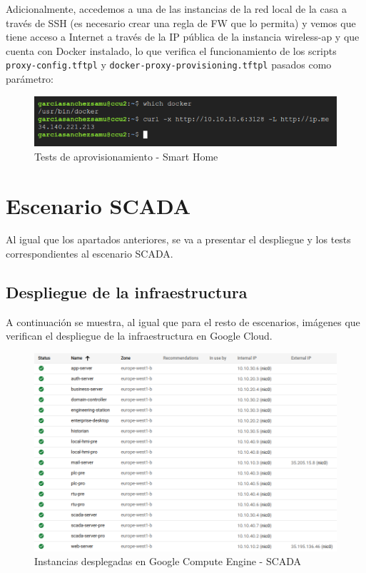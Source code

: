   Adicionalmente, accedemos a una de las instancias de la red local de la casa a través de SSH (es necesario crear una regla de FW que lo permita) y vemos que tiene acceso a Internet a través de la IP pública de la instancia wireless-ap y que cuenta con Docker instalado, lo que verifica el funcionamiento de los scripts \texttt{proxy-config.tftpl} y \texttt{docker-proxy-provisioning.tftpl} pasados como parámetro:

  \begin{figure}[h]
  \centering
  \includegraphics[width=\textwidth]{../imgs/desarrollo/resultados/sh/tests2.png}
  \caption{Tests de aprovisionamiento - Smart Home}
  \end{figure}
  \clearpage

\section{Escenario SCADA}
  Al igual que los apartados anteriores, se va a presentar el despliegue y los tests correspondientes al escenario SCADA.
  
\subsection{Despliegue de la infraestructura}
  A continuación se muestra, al igual que para el resto de escenarios, imágenes que verifican el despliegue de la infraestructura en Google Cloud. 

  \begin{figure}[h]
  \centering
  \includegraphics[width=\textwidth]{../imgs/desarrollo/resultados/scada/instances.png}
  \caption{Instancias desplegadas en Google Compute Engine - SCADA}
  \end{figure}

